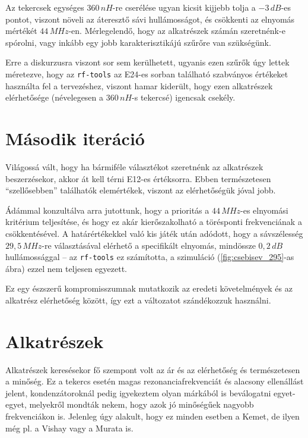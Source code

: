 Az tekercsek egységes $360\,nH$-re cserélése ugyan kicsit kijjebb tolja a $-3\,dB$-es pontot, viszont növeli az áteresztő sávi hullámosságot, és csökkenti az elnyomás mértékét $44\,MHz$-en. Mérlegelendő, hogy az alkatrészek számán szeretnénk-e spórolni, vagy inkább egy jobb karakterisztikájú szűrőre van szükségünk.

Erre a diskurzusra viszont sor sem kerülhetett, ugyanis ezen szűrők úgy lettek méretezve, hogy az \texttt{rf-tools} az E24-es sorban található szabványos értékeket használta fel a tervezéshez, viszont hamar kiderült, hogy ezen alkatrészek elérhetősége (névelegesen a $360\,nH$-s tekercsé) igencsak csekély.

\newpage


\section*{Második iteráció}

Világossá vált, hogy ha bármiféle választékot szeretnénk az alkatrészek beszerzésekor, akkor át kell térni E12-es értéksorra. Ebben természetesen \enquote{szellősebben} találhatók elemértékek, viszont az elérhetőségük jóval jobb.

Ádámmal konzultálva arra jutottunk, hogy a prioritás a $44\,MHz$-es elnyomási kritérium teljesítése, és hogy ez akár kierőszakolható a törésponti frekvenciának a csökkentésével. A határértékekkel való kis játék után adódott, hogy a sávszélesség $29,5\,MHz$-re választásával elérhető a specifikált elnyomás, mindössze $0,2\,dB$ hullámossággal -- az \texttt{rf-tools} ez számította, a szimuláció (\ref{fig:csebisev_295}-as ábra) ezzel nem teljesen egyezett.

Ez egy észszerű kompromisszumnak mutatkozik az eredeti követelmények és az alkatrész elérhetőség között, így ezt a változatot szándékozzuk használni.


\section*{Alkatrészek}

Alkatrészek keresésekor fő szempont volt az ár és az elérhetőség és természetesen a minőség. Ez a tekercs esetén magas rezonanciafrekvenciát és alacsony ellenállást jelent, kondenzátoroknál pedig igyekeztem olyan márkából is beválogatni egyet-egyet, melyekről mondták nekem, hogy azok jó minőségűek nagyobb frekvenciákon is. Jelenleg úgy alakult, hogy ez minden esetben a Kemet, de ilyen még pl. a Vishay vagy a Murata is.

